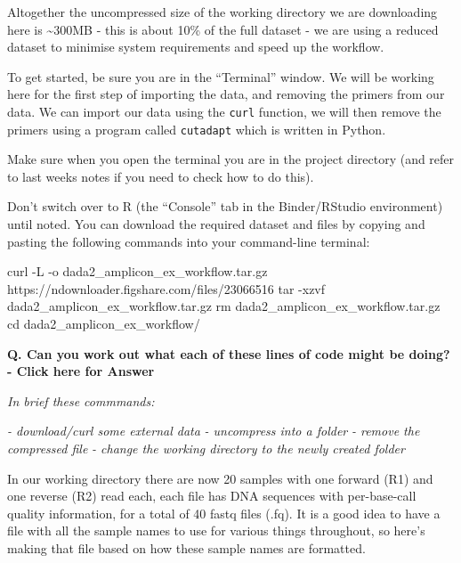 \documentclass[
]{book}
\newenvironment{Shaded}{\begin{snugshade}}{\end{snugshade}}
\newcommand{\AttributeTok}[1]{\textcolor[rgb]{0.77,0.63,0.00}{#1}}
\newcommand{\BuiltInTok}[1]{#1}
\newcommand{\ExtensionTok}[1]{#1}
\newcommand{\FunctionTok}[1]{\textcolor[rgb]{0.00,0.00,0.00}{#1}}
\newcommand{\NormalTok}[1]{#1}
\begin{document}
Altogether the uncompressed size of the working directory we are downloading here is \textasciitilde300MB - this is about 10\% of the full dataset - we are using a reduced dataset to minimise system requirements and speed up the workflow.

To get started, be sure you are in the ``Terminal'' window. We will be working here for the first step of importing the data, and removing the primers from our data. We can import our data using the \texttt{curl} function, we will then remove the primers using a program called \texttt{cutadapt} which is written in Python.

Make sure when you open the terminal you are in the project directory (and refer to last weeks notes if you need to check how to do this).

Don't switch over to R (the ``Console'' tab in the Binder/RStudio environment) until noted. You can download the required dataset and files by copying and pasting the following commands into your command-line terminal:

\begin{Shaded}
\begin{Highlighting}[]
    \ExtensionTok{curl} \AttributeTok{{-}L} \AttributeTok{{-}o}\NormalTok{ dada2\_amplicon\_ex\_workflow.tar.gz https://ndownloader.figshare.com/files/23066516}
    \FunctionTok{tar} \AttributeTok{{-}xzvf}\NormalTok{ dada2\_amplicon\_ex\_workflow.tar.gz}
    \FunctionTok{rm}\NormalTok{ dada2\_amplicon\_ex\_workflow.tar.gz}
    \BuiltInTok{cd}\NormalTok{ dada2\_amplicon\_ex\_workflow/}
\end{Highlighting}
\end{Shaded}

\textbf{Q. Can you work out what each of these lines of code might be doing? - Click here for Answer}

\emph{In brief these commmands:}

\emph{- download/curl some external data}
\emph{- uncompress into a folder}
\emph{- remove the compressed file}
\emph{- change the working directory to the newly created folder}

In our working directory there are now 20 samples with one forward (R1) and one reverse (R2) read each, each file has DNA sequences with per-base-call quality information, for a total of 40 fastq files (.fq). It is a good idea to have a file with all the sample names to use for various things throughout, so here's making that file based on how these sample names are formatted.
\end{document}
